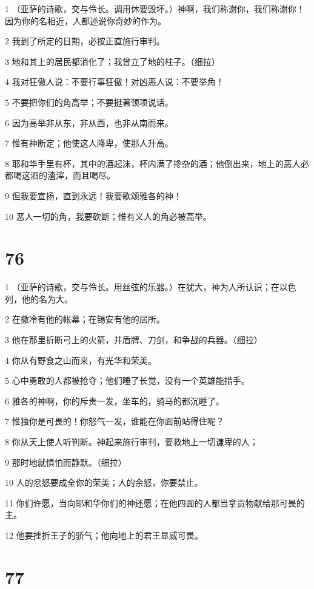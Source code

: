 \par 1 （亚萨的诗歌，交与伶长。调用休要毁坏。）神啊，我们称谢你，我们称谢你！因为你的名相近，人都述说你奇妙的作为。
\par 2 我到了所定的日期，必按正直施行审判。
\par 3 地和其上的居民都消化了；我曾立了地的柱子。（细拉）
\par 4 我对狂傲人说：不要行事狂傲！对凶恶人说：不要举角！
\par 5 不要把你们的角高举；不要挺著颈项说话。
\par 6 因为高举非从东，非从西，也非从南而来。
\par 7 惟有神断定；他使这人降卑，使那人升高。
\par 8 耶和华手里有杯，其中的酒起沫，杯内满了搀杂的酒；他倒出来，地上的恶人必都喝这酒的渣滓，而且喝尽。
\par 9 但我要宣扬，直到永远！我要歌颂雅各的神！
\par 10 恶人一切的角，我要砍断；惟有义人的角必被高举。

\chapter{76}

\par 1 （亚萨的诗歌，交与伶长。用丝弦的乐器。）在犹大，神为人所认识；在以色列，他的名为大。
\par 2 在撒冷有他的帐幕；在锡安有他的居所。
\par 3 他在那里折断弓上的火箭，并盾牌、刀剑，和争战的兵器。（细拉）
\par 4 你从有野食之山而来，有光华和荣美。
\par 5 心中勇敢的人都被抢夺；他们睡了长觉，没有一个英雄能措手。
\par 6 雅各的神啊，你的斥责一发，坐车的，骑马的都沉睡了。
\par 7 惟独你是可畏的！你怒气一发，谁能在你面前站得住呢？
\par 8 你从天上使人听判断。神起来施行审判，要救地上一切谦卑的人；
\par 9 那时地就惧怕而静默。（细拉）
\par 10 人的忿怒要成全你的荣美；人的余怒，你要禁止。
\par 11 你们许愿，当向耶和华你们的神还愿；在他四面的人都当拿贡物献给那可畏的主。
\par 12 他要挫折王子的骄气；他向地上的君王显威可畏。

\chapter{77}

